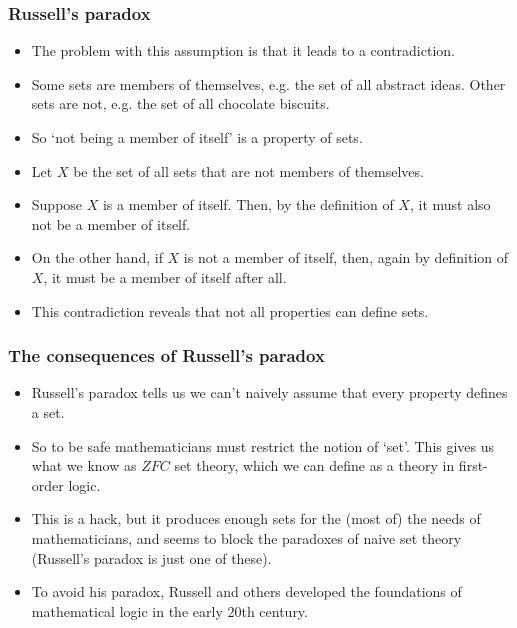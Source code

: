 \documentclass[handout]{beamer}
\begin{document}
\begin{frame}
\frametitle{Russell's paradox}
\begin{itemize}
\item The problem with this assumption is that it leads to a contradiction.
\item Some sets are members of themselves, e.g. the set of all abstract ideas. Other sets are not, e.g. the set of all chocolate biscuits. 
\item So `not being a member of itself' is a property of sets.
\item Let $X$ be the set of all sets that are not members of themselves.
\item Suppose $X$ is a member of itself. Then, by the definition of $X$, it must also not be a member of itself.
\item On the other hand, if $X$ is not a member of itself, then, again by definition of $X$, it must be a member of itself after all.
\item This contradiction reveals that not all properties can define sets.
\end{itemize}
\end{frame}

\begin{frame}
\frametitle{The consequences of Russell's paradox}
\begin{itemize}
\item Russell's paradox tells us we can't naively assume that every property defines a set.
\vspace{0.2cm}
\item So to be safe mathematicians must restrict the notion of `set'. This gives us what we know as $ZFC$ set theory, which we can define as a theory in first-order logic.
\vspace{0.2cm}
\item This is a hack, but it produces enough sets for the (most of) the needs of mathematicians, and seems to block the paradoxes of naive set theory (Russell's paradox is just one of these).
\vspace{0.2cm}
\item To avoid his paradox, Russell and others developed the foundations of mathematical logic in the early 20th century.  
\end{itemize}
\end{frame}
\end{document}
